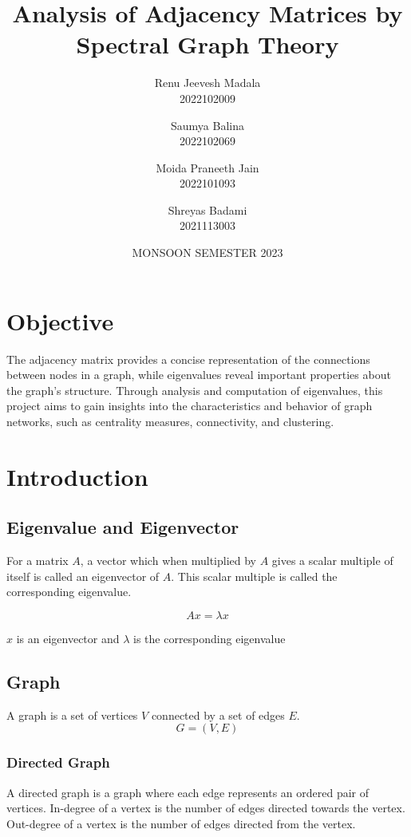 \documentclass[12pt, a4paper]{article}
\title{Analysis of Adjacency Matrices by Spectral Graph Theory}
\author{
  Renu Jeevesh Madala\\
  2022102009
  \and
  Saumya Balina \\
  2022102069
  \and
  Moida Praneeth Jain \\
  2022101093
  \and
  Shreyas Badami \\
  2021113003
}
\date{MONSOON SEMESTER 2023}
\begin{document}
    \begin{titlepage}
      \maketitle
      \thispagestyle{empty}
    \end{titlepage}

    \section{Objective}
    The adjacency matrix provides a concise representation of the connections between nodes in a graph, while eigenvalues reveal important properties about
    the graph’s structure. Through analysis and computation of eigenvalues, this
    project aims to gain insights into the characteristics and behavior of graph networks, such as centrality measures, connectivity, and clustering.

    \section{Introduction}

      \subsection{Eigenvalue and Eigenvector}
      \begin{flushleft}
      For a matrix $A$, a vector which when multiplied by $A$ gives a scalar multiple of itself is called an eigenvector of $A$. This scalar multiple is called the corresponding eigenvalue.

      $$Ax = \lambda x$$

      $x$ is an eigenvector and $\lambda$ is the corresponding eigenvalue

      \end{flushleft}
      \subsection{Graph}
      A graph is a set of vertices $V$ connected by a set of edges $E$.  
      $$G = (V, E)$$
        \subsubsection{Directed Graph}
        A directed graph is a graph where each edge represents an ordered pair of vertices. In-degree of a vertex is the number of edges directed towards the vertex. Out-degree of a vertex is the number of edges directed from the vertex.
\end{document}
